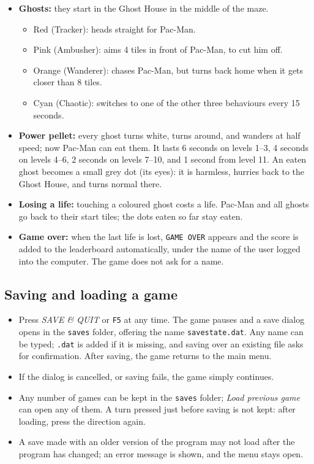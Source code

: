 \documentclass[11pt, a4paper]{article}
\begin{document}
\begin{itemize}
    \item \textbf{Ghosts:} they start in the Ghost House in the middle of the maze.
    \begin{itemize}
        \item Red (Tracker): heads straight for Pac-Man.
        \item Pink (Ambusher): aims 4 tiles in front of Pac-Man, to cut him off.
        \item Orange (Wanderer): chases Pac-Man, but turns back home when it gets closer than 8 tiles.
        \item Cyan (Chaotic): switches to one of the other three behaviours every 15 seconds.
    \end{itemize}
    \item \textbf{Power pellet:} every ghost turns white, turns around, and wanders at half speed; now Pac-Man can eat them. It lasts 6 seconds on levels 1--3, 4 seconds on levels 4--6, 2 seconds on levels 7--10, and 1 second from level 11. An eaten ghost becomes a small grey dot (its eyes): it is harmless, hurries back to the Ghost House, and turns normal there.
    \item \textbf{Losing a life:} touching a coloured ghost costs a life. Pac-Man and all ghosts go back to their start tiles; the dots eaten so far stay eaten.
    \item \textbf{Game over:} when the last life is lost, \texttt{GAME OVER} appears and the score is added to the leaderboard automatically, under the name of the user logged into the computer. The game does not ask for a name.
\end{itemize}

\subsection*{Saving and loading a game}
\begin{itemize}
    \item Press \textit{SAVE \& QUIT} or \texttt{F5} at any time. The game pauses and a save dialog opens in the \texttt{saves} folder, offering the name \texttt{savestate.dat}. Any name can be typed; \texttt{.dat} is added if it is missing, and saving over an existing file asks for confirmation. After saving, the game returns to the main menu.
    \item If the dialog is cancelled, or saving fails, the game simply continues.
    \item Any number of games can be kept in the \texttt{saves} folder; \textit{Load previous game} can open any of them. A turn pressed just before saving is not kept: after loading, press the direction again.
    \item A save made with an older version of the program may not load after the program has changed; an error message is shown, and the menu stays open.
\end{itemize}
\end{document}
